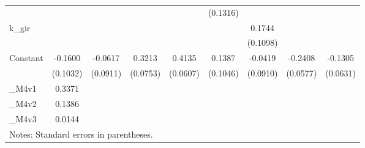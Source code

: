 \begin{table}[htbp]
\begin{tabular}{l*{8}{c}}
                              &                   &                   &                   &                   &  (0.1316)         &                   &                   &                   \\
[1em]
k\_gir                         &                   &                   &                   &                   &                   &    0.1744         &                   &                   \\
                              &                   &                   &                   &                   &                   &  (0.1098)         &                   &                   \\
[1em]
Constant                      &   -0.1600         &   -0.0617         &    0.3213\sym{***}&    0.4135\sym{***}&    0.1387         &   -0.0419         &   -0.2408\sym{***}&   -0.1305\sym{**} \\
                              &  (0.1032)         &  (0.0911)         &  (0.0753)         &  (0.0607)         &  (0.1046)         &  (0.0910)         &  (0.0577)         &  (0.0631)         \\
\hline
\_M4v1                         &    0.3371         &                   &                   &                   &                   &                   &                   &                   \\
\_M4v2                         &    0.1386         &                   &                   &                   &                   &                   &                   &                   \\
\_M4v3                         &    0.0144         &                   &                   &                   &                   &                   &                   &                   \\
\hline\hline
\multicolumn{9}{l}{\footnotesize Notes: Standard errors in parentheses.}\\
\end{tabular}
\end{table}
